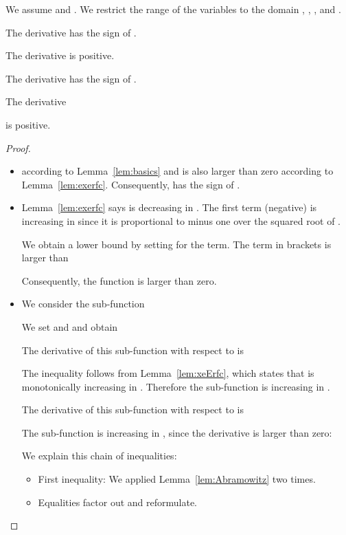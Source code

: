 \documentclass{article}
\begin{document}
\begin{lemma}
\label{proof:mapDerivatives}
We assume  and .
We restrict the range of the variables to the domain
,
,
, and
.

The derivative 
has the sign of .

The derivative 
is positive.

The derivative 
has the sign of .

The derivative 

is positive.
\end{lemma}


\begin{proof}
\begin{itemize}
\item 

 according to 
Lemma~\ref{lem:basics} and 
is also larger than zero according to Lemma~\ref{lem:exerfc}.
Consequently, has 
the sign of .

\item 

Lemma~\ref{lem:exerfc} says 
 is decreasing in .
The first term (negative) is increasing in  since it is
proportional to minus
one over the squared root of  .

We obtain a lower bound by
setting  for the  term.
The term in brackets is larger than

Consequently, the function is larger than zero.


\item 

We consider the sub-function

We set  and  and obtain


The derivative of this sub-function with respect to  is


The inequality follows from Lemma~\ref{lem:xeErfc}, which states that 
 is monotonically increasing in .
Therefore the sub-function is increasing in . 

The derivative of this sub-function with respect to  is


The sub-function is increasing in , since the
derivative is larger than zero:

We explain this chain of inequalities:
\begin{itemize}
\item First inequality: We applied Lemma~\ref{lem:Abramowitz} two times.

\item Equalities factor out  and reformulate.


\end{itemize}
\end{itemize}
\end{proof}
\end{document}
